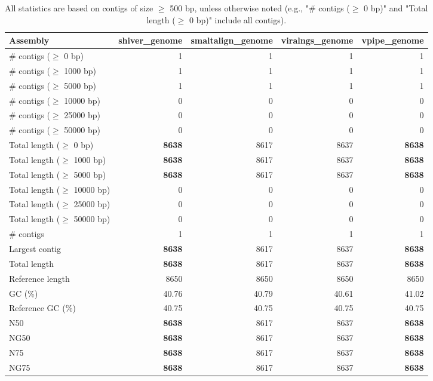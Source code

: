 \documentclass[12pt,a4paper]{article}
\begin{document}
\begin{table}[ht]
\begin{center}
\caption{All statistics are based on contigs of size $\geq$ 500 bp, unless otherwise noted (e.g., "\# contigs ($\geq$ 0 bp)" and "Total length ($\geq$ 0 bp)" include all contigs).}
\begin{tabular}{|l*{4}{|r}|}
\hline
Assembly & shiver\_genome & smaltalign\_genome & viralngs\_genome & vpipe\_genome \\ \hline
\# contigs ($\geq$ 0 bp) & 1 & 1 & 1 & 1 \\ \hline
\# contigs ($\geq$ 1000 bp) & 1 & 1 & 1 & 1 \\ \hline
\# contigs ($\geq$ 5000 bp) & 1 & 1 & 1 & 1 \\ \hline
\# contigs ($\geq$ 10000 bp) & 0 & 0 & 0 & 0 \\ \hline
\# contigs ($\geq$ 25000 bp) & 0 & 0 & 0 & 0 \\ \hline
\# contigs ($\geq$ 50000 bp) & 0 & 0 & 0 & 0 \\ \hline
Total length ($\geq$ 0 bp) & {\bf 8638} & 8617 & 8637 & {\bf 8638} \\ \hline
Total length ($\geq$ 1000 bp) & {\bf 8638} & 8617 & 8637 & {\bf 8638} \\ \hline
Total length ($\geq$ 5000 bp) & {\bf 8638} & 8617 & 8637 & {\bf 8638} \\ \hline
Total length ($\geq$ 10000 bp) & 0 & 0 & 0 & 0 \\ \hline
Total length ($\geq$ 25000 bp) & 0 & 0 & 0 & 0 \\ \hline
Total length ($\geq$ 50000 bp) & 0 & 0 & 0 & 0 \\ \hline
\# contigs & 1 & 1 & 1 & 1 \\ \hline
Largest contig & {\bf 8638} & 8617 & 8637 & {\bf 8638} \\ \hline
Total length & {\bf 8638} & 8617 & 8637 & {\bf 8638} \\ \hline
Reference length & 8650 & 8650 & 8650 & 8650 \\ \hline
GC (\%) & 40.76 & 40.79 & 40.61 & 41.02 \\ \hline
Reference GC (\%) & 40.75 & 40.75 & 40.75 & 40.75 \\ \hline
N50 & {\bf 8638} & 8617 & 8637 & {\bf 8638} \\ \hline
NG50 & {\bf 8638} & 8617 & 8637 & {\bf 8638} \\ \hline
N75 & {\bf 8638} & 8617 & 8637 & {\bf 8638} \\ \hline
NG75 & {\bf 8638} & 8617 & 8637 & {\bf 8638} \\ \hline

\end{tabular}
\end{center}
\end{table}
\end{document}
